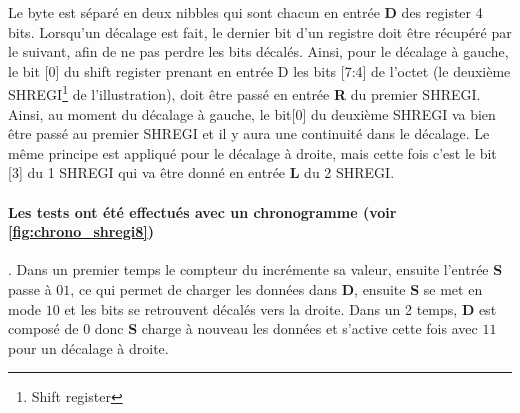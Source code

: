\documentclass[a4paper]{article} %
\begin{document}
\begin{tcolorbox}[colframe=Monokaimagenta,colback=white]
Le byte est séparé en deux nibbles qui sont chacun en entrée \textbf{D} des register 4 bits.
Lorsqu'un décalage est fait, le dernier bit d'un registre doit être récupéré par le suivant, afin de ne pas perdre les bits décalés. Ainsi, pour le décalage à gauche, le bit [0] du shift register prenant en entrée D les bits [7:4] de l'octet (le deuxième SHREGI\footnote{Shift register} de l'illustration), doit être passé en entrée \textbf{R} du premier SHREGI. Ainsi, au moment du décalage à gauche, le bit[0] du deuxième SHREGI va bien être passé au premier SHREGI et il y aura une continuité dans le décalage.
Le même principe est appliqué pour le décalage à droite, mais cette fois c'est le bit [3] du 1 SHREGI qui va être donné en entrée \textbf{L} du 2 SHREGI.

\paragraph{Les tests ont été effectués avec un chronogramme (voir \ref{fig:chrono_shregi8}) }. Dans un premier temps le compteur du incrémente sa valeur, ensuite l'entrée \textbf{S} passe à $01$, ce qui permet de charger les données dans \textbf{D}, ensuite \textbf{S} se met en mode $10$ et les bits se retrouvent décalés vers la droite. Dans un 2 temps, \textbf{D} est composé de $0$ donc \textbf{S} charge à nouveau les données et s'active cette fois avec $11$ pour un décalage à droite.
  
\end{tcolorbox}
\end{document}

